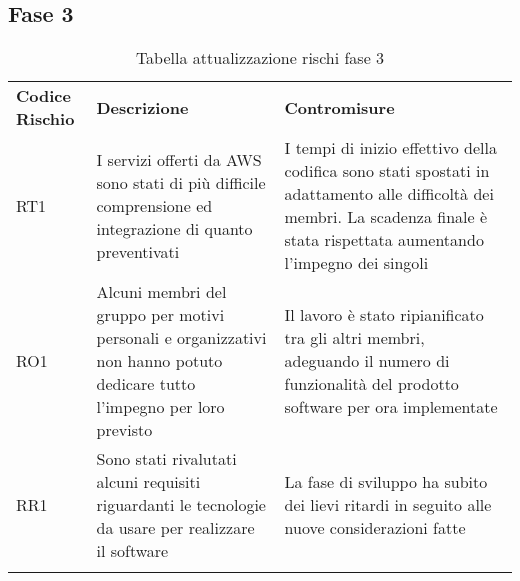 \subsection{Fase 3}
\label{sec:fase_3}
\begin{center}
\renewcommand{\arraystretch}{1.5}
	\begin{longtable}[H]{  	>{\Centering}p{2cm}	
							>{\RaggedRight}p{6cm}	
							>{\RaggedRight}p{6cm}  
							}
							
		\rowcolor{tableHeadYellow}
		\textbf{Codice Rischio}   & \textbf{Descrizione} & \textbf{Contromisure}\\ 
		RT1	&	I servizi offerti da AWS sono stati di più difficile comprensione ed integrazione di quanto preventivati & I tempi di inizio effettivo della codifica sono stati spostati in adattamento alle difficoltà dei membri. La scadenza finale è stata rispettata aumentando l'impegno dei singoli\\
		RO1	&	Alcuni membri del gruppo per motivi personali e organizzativi non hanno potuto dedicare tutto l'impegno per loro previsto & Il lavoro è stato ripianificato tra gli altri membri, adeguando il numero di funzionalità del prodotto software per ora implementate\\
		RR1	&	Sono stati rivalutati alcuni requisiti riguardanti le tecnologie da usare per realizzare il software & La fase di sviluppo ha subito dei lievi ritardi in seguito alle nuove considerazioni fatte\\
		
		\rowcolor{white}
		\caption{Tabella attualizzazione rischi fase 3}
	\end{longtable}
\end{center}
